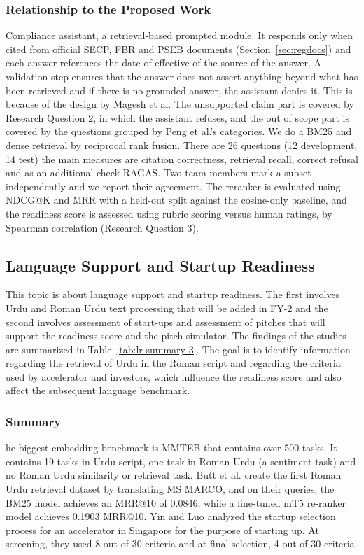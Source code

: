 \documentclass{FastFyp}
\begin{document}
\subsubsection{Relationship to the Proposed Work}
Compliance assistant, a retrieval-based prompted module. It responds only when cited from official SECP, FBR and PSEB documents (Section~\ref{sec:regdocs}) and each answer references the date of effective of the source of the answer. A validation step ensures that the answer does not assert anything beyond what has been retrieved and if there is no grounded answer, the assistant denies it. This is because of the design by Magesh et al. The unsupported claim part is covered by Research Question 2, in which the assistant refuses, and the out of scope part is covered by the questions grouped by Peng et al.'s categories. We do a BM25 and dense retrieval by reciprocal rank fusion. There are 26 questions (12 development, 14 test) the main measures are citation correctness, retrieval recall, correct refusal and as an additional check RAGAS. Two team members mark a subset independently and we report their agreement. The reranker is evaluated using NDCG@K and MRR with a held-out split against the cosine-only baseline, and the readiness score is assessed using rubric scoring versus human ratings, by Spearman correlation (Research Question 3).

\subsection{Language Support and Startup Readiness}\label{sec:lr-urdu}
This topic is about language support and startup readiness. The first involves Urdu and Roman Urdu text processing that will be added in FY-2 and the second involves assessment of start-ups and assessment of pitches that will support the readiness score and the pitch simulator. The findings of the studies are summarized in Table~\ref{tab:lr-summary-3}. The goal is to identify information regarding the retrieval of Urdu in the Roman script and regarding the criteria used by accelerator and investors, which influence the readiness score and also affect the subsequent language benchmark.

\subsubsection{Summary}
he biggest embedding benchmark is MMTEB \cite{ref:enevoldsen2025mmteb} that contains over 500 tasks. It contains 19 tasks in Urdu script, one task in Roman Urdu (a sentiment task) and no Roman Urdu similarity or retrieval task. Butt et al. \cite{ref:butt2025romanurduir} create the first Roman Urdu retrieval dataset by translating MS MARCO, and on their queries, the BM25 model achieves an MRR@10 of 0.0846, while a fine-tuned mT5 re-ranker model achieves 0.1903 MRR@10. Yin and Luo \cite{ref:yin2018accelerator} analyzed the startup selection process for an accelerator in Singapore for the purpose of starting up. At screening, they used 8 out of 30 criteria and at final selection, 4 out of 30 criteria.
\end{document}
